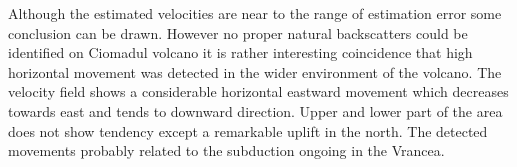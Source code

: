 \documentclass[18pt, a0paper, landscape]{tikzposter}
\begin{document}
\begin{columns}
{        
        {
            Although the estimated velocities are near to the range of
            estimation error some conclusion can be drawn. However no proper
            natural backscatters could be identified on Ciomadul volcano it is
            rather interesting coincidence that high horizontal movement was
            detected in the wider environment of the volcano. The velocity
            field shows a considerable horizontal eastward movement which
            decreases towards east and tends to downward direction. Upper and
            lower part of the area does not show tendency except a  remarkable
            uplift in the north. The detected movements probably related to
            the subduction ongoing in the Vrancea.
        }
    }


\end{columns}
\end{document}
